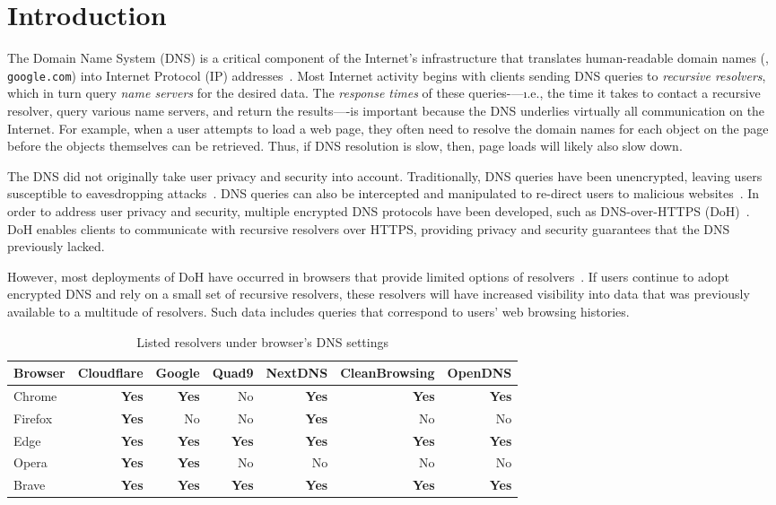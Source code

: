 \section{Introduction}\label{sec:intro}
The Domain Name System (DNS) is a critical component of the Internet's infrastructure that translates human-readable domain names (\eg, \texttt{google.com}) into Internet Protocol (IP) addresses~\cite{dns-rfcs}.
Most Internet activity begins with clients sending DNS queries to \emph{recursive resolvers}, which in turn query \emph{name servers} for the desired data.
The \emph{response times} of these queries-—\i.e., the time it takes to contact a recursive resolver, query various name servers, and return the results—-is important because the DNS underlies virtually all communication on the Internet.
For example, when a user attempts to load a web page, they often need to resolve the domain names for each object on the page before the objects themselves can be retrieved.
Thus, if DNS resolution is slow, then, page loads will likely also slow down.

The DNS did not originally take user privacy and security into account.
Traditionally, DNS queries have been unencrypted, leaving users susceptible to eavesdropping attacks~\cite{dns-eavesdrop}.
DNS queries can also be intercepted and manipulated to re-direct users to malicious websites~\cite{dns-redirect}.
In order to address user privacy and security, multiple encrypted DNS protocols have been developed, such as DNS-over-HTTPS (DoH)~\cite{rfc8484}.
DoH enables clients to communicate with recursive resolvers over HTTPS, providing privacy and security guarantees that the DNS previously lacked.

However, most deployments of DoH have occurred in browsers that provide limited options of resolvers~\cite{9,6}.
If users continue to adopt encrypted DNS and rely on a small set of recursive resolvers, these resolvers will have increased visibility into data that was previously available to a multitude of resolvers.
Such data includes queries that correspond to users' web browsing histories.

\begin{table}
    \centering
    \begin{tabular}{lrrrrrr}
    \hline
    Browser & Cloudflare & Google & Quad9 & NextDNS & CleanBrowsing & OpenDNS
    \\
    \midrule
    Chrome    & \textbf{Yes} & \textbf{Yes} & No & \textbf{Yes} & \textbf{Yes} & \textbf{Yes} \\
    Firefox  & \textbf{Yes} & No & No & \textbf{Yes} & No & No \\ 
    Edge   & \textbf{Yes} & \textbf{Yes} & \textbf{Yes} & \textbf{Yes} & \textbf{Yes} & \textbf{Yes} \\
    Opera            & \textbf{Yes} & \textbf{Yes} & No & No & No & No \\
    Brave            & \textbf{Yes} & \textbf{Yes} & \textbf{Yes} & \textbf{Yes} & \textbf{Yes} & \textbf{Yes} \\
    \bottomrule
    \end{tabular}
    \caption{Listed resolvers under browser's DNS settings}
    \label{tab:SupportedResolvers}
\end{table}

